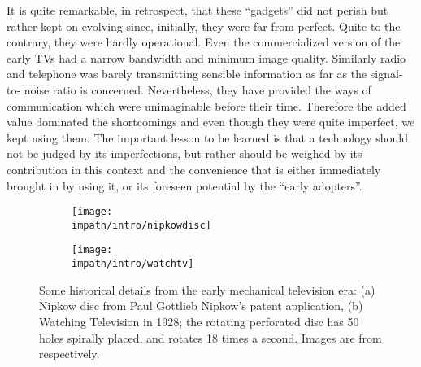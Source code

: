 It is quite remarkable, in retrospect, that these \enquote{gadgets} did not perish but rather kept on evolving since, initially, they were 
far from perfect. Quite to the contrary, they were hardly operational. Even the commercialized version of the early TVs had a narrow 
bandwidth and minimum image quality. Similarly radio and telephone was barely transmitting sensible information as far as the signal-to-
noise ratio is concerned. Nevertheless, they have provided the ways of communication which were unimaginable before their time. Therefore 
the added value dominated the shortcomings and even though they were quite imperfect, we kept using them. The important lesson to be 
learned is that a technology should not be judged by its imperfections, but rather should be weighed by its contribution in this context 
and the convenience that is either immediately brought in by using it, or its foreseen potential by the \enquote{early adopters}. 
\begin{figure}
\begin{subfigure}[b]{.3\linewidth}
\centering%
\texttt{[image: \\impath/intro/nipkowdisc]}%
\caption{}
\label{fig:intro:nipkow}
\end{subfigure}%
\begin{subfigure}[b]{.65\linewidth}
\centering%
\texttt{[image: \\impath/intro/watchtv]}%
\caption{}
\label{fig:intro:watchtv}
\end{subfigure}
\caption[Some historical details from the early mechanical television era]%
{Some historical details from the early mechanical television era: (a) Nipkow disc from Paul Gottlieb Nipkow's patent application, 
(b) Watching Television in 1928; the rotating perforated disc has 50 holes spirally placed, and rotates 18 times a second. Images are 
from \cite{nipkow,watchtv} respectively.%
}
\label{fig:intro:mechtv}
\end{figure}


